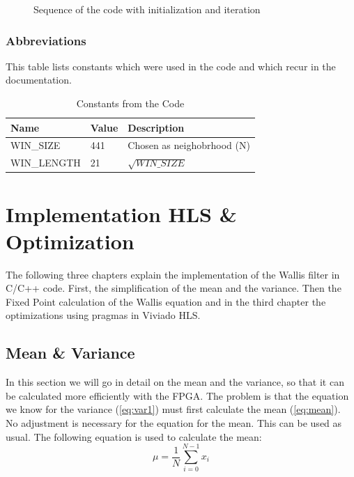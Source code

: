 \begin{figure}[tb!]
    \centering
    \begin{adjustbox}{max width=\textwidth}
        
    \end{adjustbox}
    \caption{Sequence of the code with initialization and iteration}
    \label{fig:sequence}
\end{figure}

\subsubsection*{Abbreviations}
This table lists constants which were used in the code and which recur in the documentation.

\begin{table}[tb!]
    \centering
    \begin{tabular}{l l l}
        \toprule
        Name & Value & Description  \\
        \midrule
        WIN\_SIZE & 441 & Chosen as neighobrhood (N)
        \\
        WIN\_LENGTH & 21 & $\sqrt{WIN\_SIZE}$ 
        \\
        \bottomrule
    \end{tabular}
    \caption{Constants from the Code}
    \label{tab:c_div}
\end{table}


\section{Implementation HLS \& Optimization}
The following three chapters explain the implementation of the Wallis filter in C/C++ code. First, the simplification of the mean and the variance. Then the Fixed Point calculation of the Wallis equation and in the third chapter the optimizations using pragmas in Viviado HLS.

\subsection{Mean \& Variance} \label{ch:ip:mean_var}
In this section we will go in detail on the mean and the variance, so that it can be calculated more efficiently with the FPGA. The problem is that the equation we know for the variance (\ref{eq:var1}) must first calculate the mean (\ref{eq:mean}). \\
No adjustment is necessary for the equation for the mean. This can be used as usual. The following equation	is used to calculate the mean:
\begin{equation}
    \mu = \frac{1}{N} \sum_{i = 0}^{N - 1} x_{i}
    \label{eq:mean}
\end{equation} 


